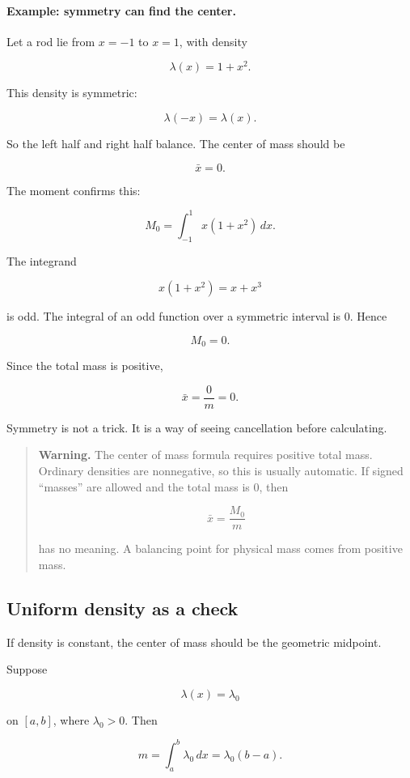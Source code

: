 \paragraph{Example: symmetry can find the center.}
Let a rod lie from \(x=-1\) to \(x=1\), with density

\[
\lambda(x)=1+x^2.
\]

This density is symmetric:

\[
\lambda(-x)=\lambda(x).
\]

So the left half and right half balance.  The center of mass should be

\[
\bar x=0.
\]

The moment confirms this:

\[
M_0=\int_{-1}^1 x(1+x^2)\,dx.
\]

The integrand

\[
x(1+x^2)=x+x^3
\]

is odd.  The integral of an odd function over a symmetric interval is \(0\).  Hence

\[
M_0=0.
\]

Since the total mass is positive,

\[
\bar x=\frac{0}{m}=0.
\]

Symmetry is not a trick.  It is a way of seeing cancellation before calculating.

\begin{quote}
\textbf{Warning.}
The center of mass formula requires positive total mass.  Ordinary densities are
nonnegative, so this is usually automatic.  If signed ``masses'' are allowed and the
total mass is \(0\), then

\[
\bar x=\frac{M_0}{m}
\]

has no meaning.  A balancing point for physical mass comes from positive mass.
\end{quote}

\subsection{Uniform density as a check}
\label{subsec:uniform-density-check}

If density is constant, the center of mass should be the geometric midpoint.

Suppose

\[
\lambda(x)=\lambda_0
\]

on \([a,b]\), where \(\lambda_0>0\).  Then

\[
m=\int_a^b \lambda_0\,dx=\lambda_0(b-a).
\]

